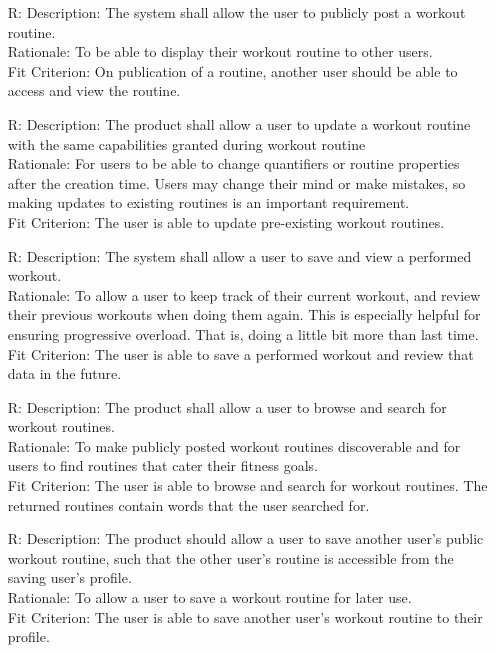 \documentclass[12pt]{article}
\newcounter{reqnum} %
\begin{document}
\begin{itemize}
\item[R\refstepcounter{reqnum}\thereqnum \label{R_Inputs}:]
Description: The system shall allow the user to publicly post a workout routine.
\\ Rationale: To be able to display their workout routine to other users.
\\ Fit Criterion: On publication of a routine, another user should be able to access and view the routine.

\item[R\refstepcounter{reqnum}\thereqnum \label{R_Inputs}:]
Description: The product shall allow a user to update a workout routine with the same capabilities granted during workout routine
\\ Rationale: For users to be able to change quantifiers or routine properties after the creation time. Users may change their mind or make mistakes, so making updates to existing routines is an important requirement.
\\ Fit Criterion: The user is able to update pre-existing workout routines.

\item[R\refstepcounter{reqnum}\thereqnum \label{R_Inputs}:]
Description: The system shall allow a user to save and view a performed workout.
\\ Rationale: To allow a user to keep track of their current workout, and review their previous workouts when doing them again.
This is especially helpful for ensuring progressive overload. That is, doing a little bit more than last time.
\\ Fit Criterion: The user is able to save a performed workout and review that data in the future.

\item[R\refstepcounter{reqnum}\thereqnum \label{R_Inputs}:]
Description: The product shall allow a user to browse and search for workout routines.
\\ Rationale: To make publicly posted workout routines discoverable and for users to find routines that cater their fitness goals.
\\ Fit Criterion: The user is able to browse and search for workout routines. The returned routines contain words that the user searched for.

\item[R\refstepcounter{reqnum}\thereqnum \label{R_Inputs}:]
Description: The product should allow a user to save another user's public workout routine, such that the other user's routine is accessible from the saving user's profile.
\\ Rationale: To allow a user to save a workout routine for later use.
\\ Fit Criterion: The user is able to save another user's workout routine to their profile.


\end{itemize}
\end{document}

